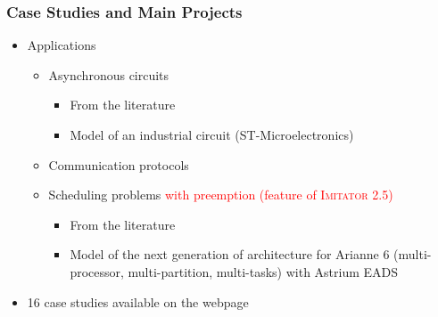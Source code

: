 \documentclass[professionalfont]{beamer}
\newcommand{\couleur}[1]{\textcolor{couleurimportante}{#1}}
\newcommand{\refer}[1]{\textcolor{couleurref}{\cite{#1}}}
\newcommand{\imitator}{\textsc{Imitator}}
\begin{document}
\begin{frame}
\frametitle{Case Studies and Main Projects}

\begin{itemize}
	\item Applications

	\begin{itemize}
		\item Asynchronous circuits
		\begin{itemize}
			\item From the literature
			\item Model of an industrial circuit (ST-Microelectronics)
		\end{itemize}
		\item Communication protocols
		\item Scheduling problems \textcolor{red}{with preemption (feature of \imitator{} 2.5)}
		\begin{itemize}
			\item From the literature
			\item Model of the next generation of architecture for Arianne 6 (multi-processor, multi-partition, multi-tasks) with Astrium EADS
		\end{itemize}
	\end{itemize}
	\item 16 case studies available on the webpage

% 
% 
% 		
% 		


\end{itemize}

\end{frame}



\end{document}
